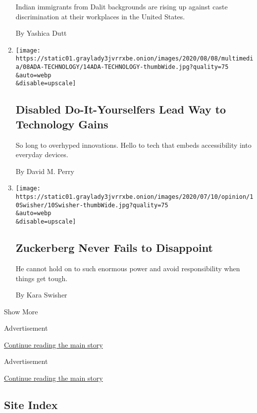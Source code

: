 \begin{enumerate}
  Indian immigrants from Dalit backgrounds are rising up against caste
  discrimination at their workplaces in the United States.

  By Yashica Dutt
\item
  \href{/2020/07/14/style/assistive-technology.html}{}

  \texttt{[image: https://static01.graylady3jvrrxbe.onion/images/2020/08/08/multimedia/08ADA-TECHNOLOGY/14ADA-TECHNOLOGY-thumbWide.jpg?quality=75\\\&auto=webp\\\&disable=upscale]}

  \hypertarget{disabled-do-it-yourselfers-lead-way-to-technology-gains}{%
  \subsection{Disabled Do-It-Yourselfers Lead Way to Technology
  Gains}\label{disabled-do-it-yourselfers-lead-way-to-technology-gains}}

  So long to overhyped innovations. Hello to tech that embeds
  accessibility into everyday devices.

  By David M. Perry
\item
  \href{/2020/07/10/opinion/facebook-zuckerberg.html}{}

  \texttt{[image: https://static01.graylady3jvrrxbe.onion/images/2020/07/10/opinion/10Swisher/10Swisher-thumbWide.jpg?quality=75\\\&auto=webp\\\&disable=upscale]}

  \hypertarget{zuckerberg-never-fails-to-disappoint}{%
  \subsection{Zuckerberg Never Fails to
  Disappoint}\label{zuckerberg-never-fails-to-disappoint}}

  He cannot hold on to such enormous power and avoid responsibility when
  things get tough.

  By Kara Swisher
\end{enumerate}

Show More

Advertisement

\protect\hyperlink{after-mid1}{Continue reading the main story}

Advertisement

\protect\hyperlink{after-mktg}{Continue reading the main story}

\hypertarget{site-index}{%
\subsection{Site Index}\label{site-index}}

